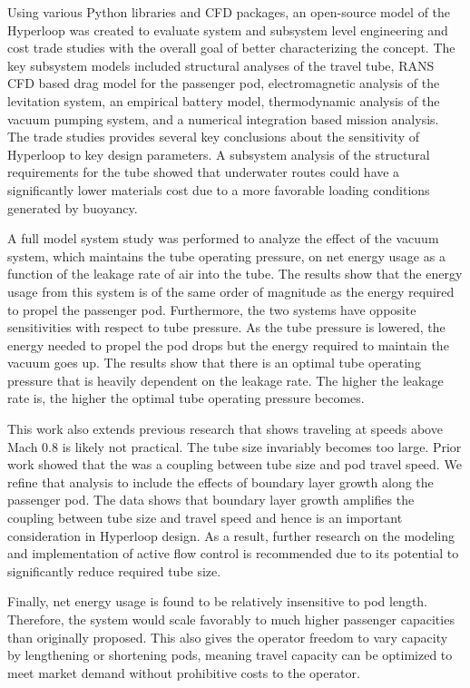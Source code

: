 Using various Python libraries and CFD packages,
an open-source model of the Hyperloop was created to
evaluate system and subsystem level engineering and cost trade studies with
the overall goal of better characterizing the concept. The key subsystem
models included structural analyses of the travel tube, RANS CFD based drag
model for the passenger pod, electromagnetic analysis of the levitation
system, an empirical battery model, thermodynamic analysis of the vacuum
pumping system, and a numerical integration based mission analysis. The trade
studies provides several key conclusions about the sensitivity of Hyperloop to
key design parameters. A subsystem analysis of the structural requirements
for the tube showed that underwater routes could have a significantly lower
materials cost due to a more favorable loading conditions generated by
buoyancy.

A full model system study was performed to analyze the effect of the vacuum
system, which maintains the tube operating pressure, on net energy usage as a
function of the leakage rate of air into the tube. The results show that the
energy usage from this system is of the same order of magnitude as the energy
required to propel the passenger pod. Furthermore, the two systems have
opposite sensitivities with respect to tube pressure. As the tube pressure is
lowered, the energy needed to propel the pod drops but the energy required to
maintain the vacuum goes up. The results show that there is
an optimal tube operating pressure that is heavily dependent on the leakage
rate. The higher the leakage rate is, the higher the optimal tube operating
pressure becomes.

This work also extends previous research that shows traveling at speeds above
Mach 0.8 is likely not practical. The tube size invariably becomes too large.
Prior work showed that the was a coupling between tube size and pod travel
speed. We refine that analysis to include the effects of boundary layer growth
along the passenger pod. The data shows that boundary layer growth amplifies
the coupling between tube size and travel speed and hence is an important
consideration in Hyperloop design. As a result, further research on the
modeling and implementation of active flow control is recommended due to its
potential to significantly reduce required tube size.

Finally, net energy usage is found to be relatively insensitive to pod length.
Therefore, the system would scale favorably to much higher passenger
capacities than originally proposed.
This also gives the operator freedom to vary capacity by lengthening or
shortening pods, meaning travel capacity can be optimized to meet market demand
without prohibitive costs to the operator.

